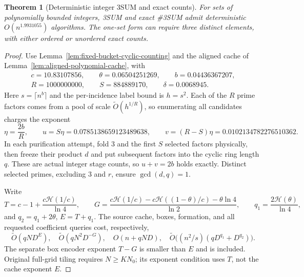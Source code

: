 \documentclass[11pt]{article}
\newtheorem{theorem}{Theorem}
\newcommand{\softO}{\widetilde O}
\newcommand{\HH}{\mathcal H}
\begin{document}
\begin{theorem}[Deterministic integer 3SUM and exact counts]
\label{thm:deterministic-cyclic-3sum}
For sets of polynomially bounded integers, 3SUM and exact \#3SUM
admit deterministic $O(n^{1.9931055})$ algorithms.  The one-set form
can require three distinct elements, with either ordered or unordered
exact counts.
\end{theorem}
\begin{proof}
Use Lemma~\ref{lem:fixed-bucket-cyclic-counting} and the aligned cache
of Lemma~\ref{lem:aligned-polynomial-cache}, with
\[
 \begin{gathered}
 c=10.83107856,\qquad\theta=0.06504251269,\qquad b=0.04436367207,\\
 R=1000000000,\qquad S=884889170,\qquad
 \delta=0.0068945.
 \end{gathered}
\]
Here $s=\lceil n^b\rceil$ and the per-incidence label bound is
$h=s^2$.  Each of the $R$ prime factors comes from a pool of scale
$\softO(h^{1/R})$, so enumerating all candidates charges the exponent
\[
 \eta=\frac{2b}{R},\qquad
 u=S\eta=0.0785138659123489638,\qquad
 v=(R-S)\eta=0.0102134782276510362.
\]
In each purification attempt, fold $3$ and the first $S$ selected
factors physically, then freeze their product $d$ and put subsequent
factors into the cyclic ring length $q$.  These are actual integer
stage counts, so $u+v=2b$ holds exactly.  Distinct selected primes,
excluding $3$ and $r$, ensure $\gcd(d,q)=1$.

Write
\[
 T=c-1+\frac{c\HH(1/c)}{\ln4},\qquad
 G=\frac{c\HH(1/c)-c\HH((1-\theta)/c)-\theta\ln4}{\ln2},
 \qquad q_1=\frac{2\HH(\theta)}{\ln4},
\]
and $q_2=q_1+2\theta$, $E=T+q_1$.  The source cache, boxes,
formation, and all requested coefficient queries cost, respectively,
\[
 \softO(qND^E),\quad\softO(qN^2D^{-G}),\quad
 O(n+qND),\quad
 \softO\bigl((n^2/s)(qD^{q_1}+D^{q_2})\bigr).
\]
The separate box encoder exponent $T-G$ is smaller than $E$ and
is included.  Original full-grid tiling requires $N\ge KN_0$;
its exponent condition uses $T$, not the cache exponent $E$.


\end{proof}
\end{document}
